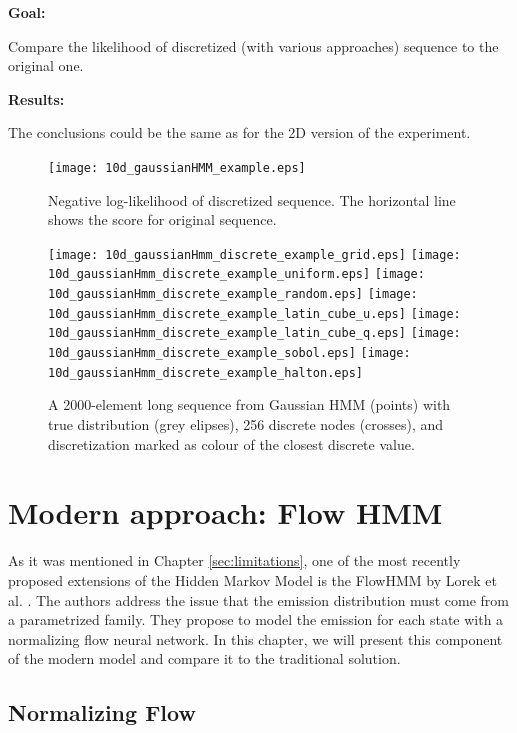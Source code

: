 \documentclass[shortabstract]{iithesis}
\begin{document}
\textbf{Goal:}

Compare the likelihood of  discretized  (with various approaches) sequence to the original one. 

\textbf{Results:}

The conclusions could be the same as for the 2D version of the experiment. 


\begin{figure}[!ht]
    \centering
    \texttt{[image: 10d\_gaussianHMM\_example.eps]}
    \caption{Negative log-likelihood of  discretized sequence. The horizontal line shows the score for original sequence.}
    \label{fig:gaussian-hmm-discrete-res}
\end{figure}

\pagebreak
\begin{figure}[!h]
    \centering
    \texttt{[image: 10d\_gaussianHmm\_discrete\_example\_grid.eps]}
    \texttt{[image: 10d\_gaussianHmm\_discrete\_example\_uniform.eps]}
    \texttt{[image: 10d\_gaussianHmm\_discrete\_example\_random.eps]}
    \texttt{[image: 10d\_gaussianHmm\_discrete\_example\_latin\_cube\_u.eps]}
    \texttt{[image: 10d\_gaussianHmm\_discrete\_example\_latin\_cube\_q.eps]}
    \texttt{[image: 10d\_gaussianHmm\_discrete\_example\_sobol.eps]}
    \texttt{[image: 10d\_gaussianHmm\_discrete\_example\_halton.eps]}
    \caption{A 2000-element long sequence from Gaussian HMM (points) with true distribution (grey elipses), 256 discrete nodes (crosses), and discretization marked as colour of the closest discrete value.}
    \label{fig:gaussian-hmm-nodes}
\end{figure}
\pagebreak




\pagebreak

\chapter{Modern approach: Flow HMM} \label{sec:flowhmm}

As it was mentioned in Chapter \ref{sec:limitations}, one of the most recently proposed extensions of the Hidden Markov Model is the FlowHMM by Lorek et al. \cite{lorek2022flowhmm}. The authors address the issue  that the emission distribution must come from a parametrized family. They propose to model the emission for each state with a normalizing flow neural network. In this chapter, we will present this component of the modern model and compare it to the traditional solution. 


\section{Normalizing Flow}
\end{document}
